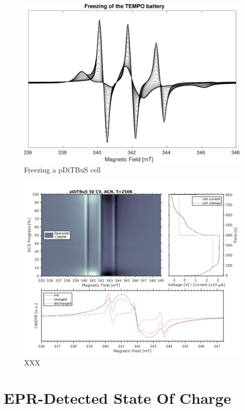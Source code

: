 \begin{figure}[h]
\center
	\includegraphics[width=1\textwidth]{./operando_epr/figures/CRYO/freezing_sandwich_230K_200K.pdf}
	\caption{Freezing a pDiTBuS cell}
	\label{fig:freezing_of_pditbus_battery_1D}
\end{figure}


\begin{figure}[h]
\center
	\includegraphics[width=1\textwidth]{./operando_epr/figures/slowcharge_231117_liquid_250K.pdf}
	\caption{XXX}
	\label{fig:operando_cold_cycle}
\end{figure}


\section{EPR-Detected State Of Charge}
\label{sec:ESOC}


